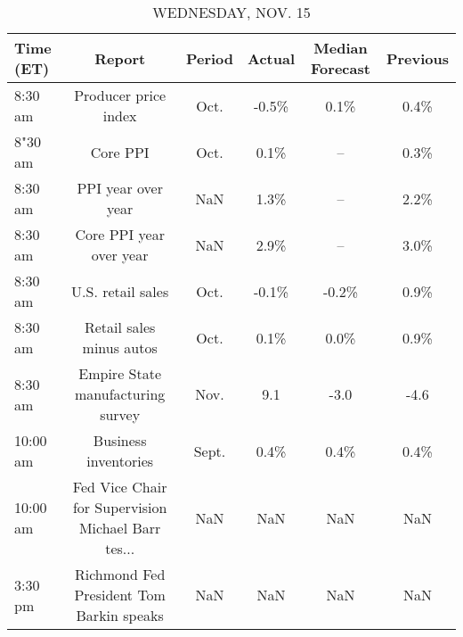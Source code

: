 \documentclass{article}%
\begin{document}
%


\begin{table}[htbp]%
\caption{WEDNESDAY, NOV. 15}%
\centering%
\begin{adjustbox}{width=1\textwidth}%
\begin{tabular}{lccccc}
\toprule
Time (ET) &                                             Report & Period & Actual & Median Forecast & Previous \\
\midrule
  8:30 am &                               Producer price index &   Oct. &  -0.5\% &            0.1\% &     0.4\% \\
  8"30 am &                                           Core PPI &   Oct. &   0.1\% &              -- &     0.3\% \\
  8:30 am &                                 PPI year over year &    NaN &   1.3\% &              -- &     2.2\% \\
  8:30 am &                            Core PPI year over year &    NaN &   2.9\% &              -- &     3.0\% \\
  8:30 am &                                  U.S. retail sales &   Oct. &  -0.1\% &           -0.2\% &     0.9\% \\
  8:30 am &                           Retail sales minus autos &   Oct. &   0.1\% &            0.0\% &     0.9\% \\
  8:30 am &                  Empire State manufacturing survey &   Nov. &    9.1 &            -3.0 &     -4.6 \\
 10:00 am &                               Business inventories &  Sept. &   0.4\% &            0.4\% &     0.4\% \\
 10:00 am & Fed Vice Chair for Supervision Michael Barr tes... &    NaN &    NaN &             NaN &      NaN \\
  3:30 pm &           Richmond Fed President Tom Barkin speaks &    NaN &    NaN &             NaN &      NaN \\
\bottomrule
\end{tabular}
%
\end{adjustbox}%
\end{table}

%
\end{document}

